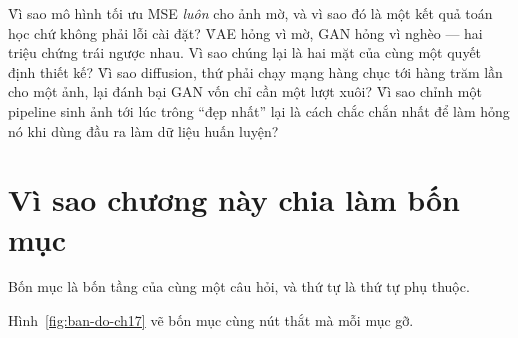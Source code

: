 \documentclass[../../deep_learning.tex]{subfiles}
\begin{document}
\begin{khoigoi}
\h{Vì sao mô hình tối ưu MSE \emph{luôn} cho ảnh mờ, và vì sao đó là một kết quả toán học chứ không phải lỗi cài đặt?}
\h{VAE hỏng vì mờ, GAN hỏng vì nghèo --- hai triệu chứng trái ngược nhau. Vì sao chúng lại là hai mặt của cùng một quyết định thiết kế?}
\h{Vì sao diffusion, thứ phải chạy mạng hàng chục tới hàng trăm lần cho một ảnh, lại đánh bại GAN vốn chỉ cần một lượt xuôi?}
\h{Vì sao chỉnh một pipeline sinh ảnh tới lúc trông ``đẹp nhất'' lại là cách chắc chắn nhất để làm hỏng nó khi dùng đầu ra làm dữ liệu huấn luyện?}
\end{khoigoi}

\section*{Vì sao chương này chia làm bốn mục}
Bốn mục là bốn tầng của cùng một câu hỏi, và thứ tự là thứ tự phụ thuộc.

Hình~\ref{fig:ban-do-ch17} vẽ bốn mục cùng nút thắt mà mỗi mục gỡ.
\end{document}
